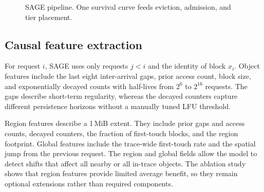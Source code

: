 \documentclass[conference]{IEEEtran}
\begin{document}
\begin{figure}[t]
\centering
{}
\caption{SAGE pipeline. One survival curve feeds eviction, admission, and tier placement.}
\label{fig:arch}
\end{figure}

\subsection{Causal feature extraction}
For request $i$, SAGE uses only requests $j<i$ and the identity of block $x_i$. Object features include the last eight inter-arrival gaps, prior access count, block size, and exponentially decayed counts with half-lives from $2^6$ to $2^{16}$ requests. The gaps describe short-term regularity, whereas the decayed counters capture different persistence horizons without a manually tuned LFU threshold.

Region features describe a 1\,MiB extent. They include prior gaps and access counts, decayed counters, the fraction of first-touch blocks, and the region footprint. Global features include the trace-wide first-touch rate and the spatial jump from the previous request. The region and global fields allow the model to detect shifts that affect all nearby or all in-trace objects. The ablation study shows that region features provide limited average benefit, so they remain optional extensions rather than required components.
\end{document}
